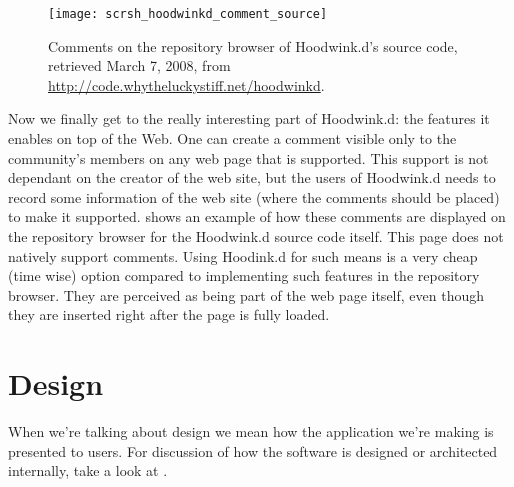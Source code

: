 \begin{figure}
  \begin{whole}
    \texttt{[image: scrsh\_hoodwinkd\_comment\_source]}
    \caption[Hoodwink.d Comments]{
      Comments on the repository browser of Hoodwink.d's source code,
      retrieved March 7, 2008, from
      \url{http://code.whytheluckystiff.net/hoodwinkd}.
    }
    \label{figure:scrsh.hoodwinkd.comment.source}
  \end{whole}
\end{figure}

Now we finally get to the really interesting part of Hoodwink.d: the features
it enables on top of the Web. One can create a comment visible only to the
community's members on any web page that is supported. This support is not
dependant on the creator of the web site, but the users of Hoodwink.d needs to
record some information of the web site (where the comments should be placed)
to make it supported.  shows an
example of how these comments are displayed on the repository browser for
the Hoodwink.d source code itself. This page does not natively support
comments. Using Hoodink.d for such means is a very cheap (time wise) option
compared to implementing such features in the repository browser.
They are perceived as being part of the web page itself, even though they
are inserted right after the page is fully loaded.

\section{Design}
\label{section:implementation.design}

When we're talking about design we mean how the application we're making is
presented to users. For discussion of how the software is designed
or architected internally, take a look at
.

